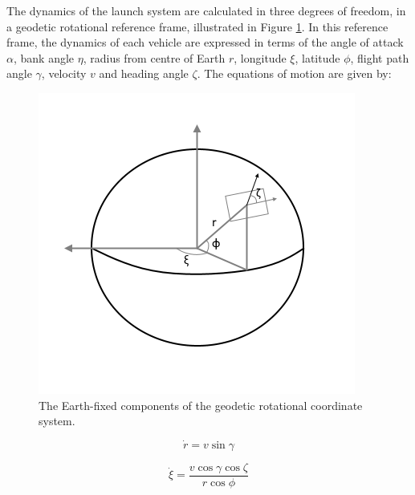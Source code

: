 The dynamics of the launch system are calculated in three degrees of freedom, in a geodetic rotational reference frame, illustrated in Figure \ref{fig:global}. In this reference frame, the dynamics of each vehicle are expressed in terms of the angle of attack $\alpha$, bank angle $\eta$, radius from centre of Earth $r$, longitude $\xi$, latitude $\phi$, flight path angle $\gamma$, velocity $v$ and heading angle $\zeta$. The equations of motion are given by\cite{Josselyn2002a}:
\begin{figure}[ht]
	\centering
	\includegraphics[width=0.7\linewidth]{figures/4_LODESTAR/global}
	\caption{The Earth-fixed components of the geodetic rotational coordinate system.}
	\label{fig:global}
\end{figure}


\begin{equation}
\dot{r} = v \sin \gamma
\end{equation}

\begin{equation}
\dot{\xi} = \frac{v\cos \gamma \cos \zeta}{r \cos \phi}
\end{equation}

